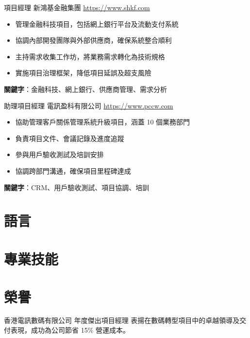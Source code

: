 \documentclass[a4paper, serif, 10pt]{moderncv}
\begin{document}
        {項目經理}
        {新鴻基金融集團}
        {\url{https://www.shkf.com}}
        {}
        {\begin{itemize}
\item 管理金融科技項目，包括網上銀行平台及流動支付系統
\item 協調內部開發團隊與外部供應商，確保系統整合順利
\item 主持需求收集工作坊，將業務需求轉化為技術規格
\item 實施項目治理框架，降低項目延誤及超支風險
\end{itemize}
\textbf{關鍵字}：金融科技、網上銀行、供應商管理、需求分析}

        {助理項目經理}
        {電訊盈科有限公司}
        {\url{https://www.pccw.com}}
        {}
        {\begin{itemize}
\item 協助管理客戶關係管理系統升級項目，涵蓋 10 個業務部門
\item 負責項目文件、會議記錄及進度追蹤
\item 參與用戶驗收測試及培訓安排
\item 協調跨部門溝通，確保項目里程碑達成
\end{itemize}
\textbf{關鍵字}：CRM、用戶驗收測試、項目協調、培訓}
\section{語言}

\section{專業技能}

\section{榮譽}

        {香港電訊數碼有限公司}
        {年度傑出項目經理}
        {}
        {}
        {表揚在數碼轉型項目中的卓越領導及交付表現，成功為公司節省 15\% 營運成本。}
\end{document}
